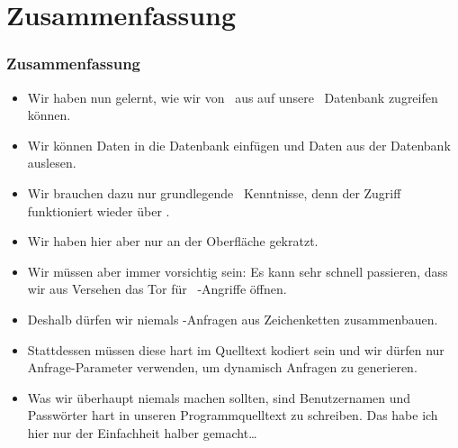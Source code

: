 \documentclass[aspectratio=169,mathserif,notheorems]{beamer}%
\begin{document}
\section{Zusammenfassung}%
%
\begin{frame}%
\frametitle{Zusammenfassung}%
\begin{itemize}%
\item Wir haben nun gelernt, wie wir von \python\ aus auf unsere \postgresql\ Datenbank zugreifen können.%
\item<2-> Wir können Daten in die Datenbank einfügen und Daten aus der Datenbank auslesen.%
\item<3-> Wir brauchen dazu nur grundlegende \python\ Kenntnisse, denn der Zugriff funktioniert wieder über \sql.%
%
\item<4-> Wir haben hier aber nur an der Oberfläche gekratzt.%
%
%
\item<7-> Wir müssen aber immer vorsichtig sein: Es kann sehr schnell passieren, dass wir aus Versehen das Tor für  \DEzB~-Angriffe öffnen.%
\item<8-> Deshalb dürfen wir niemals \sql-Anfragen aus Zeichenketten zusammenbauen.%
\item<9-> Stattdessen müssen diese hart im Quelltext kodiert sein und wir dürfen nur Anfrage-Parameter verwenden, um dynamisch Anfragen zu generieren.%
\item<10-> Was wir überhaupt niemals machen sollten, sind Benutzernamen und Passwörter hart in unseren Programmquelltext zu schreiben. Das habe ich hier nur der Einfachheit halber gemacht\dots%
\end{itemize}%
\end{frame}%
%
\endPresentation%
\end{document}
